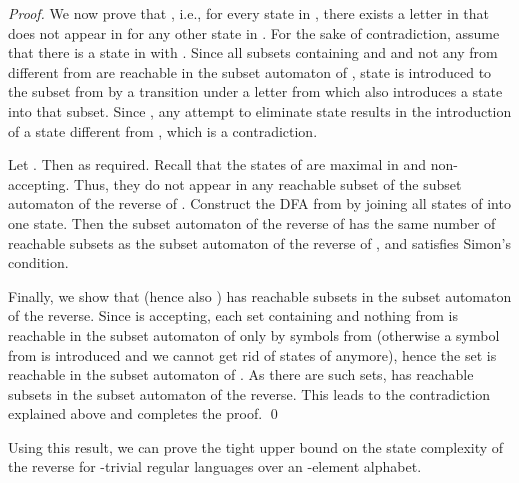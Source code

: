 \documentclass[runningheads]{llncs}
\newcommand{\J}{}
\begin{document}
\begin{proof}
    We now prove that , i.e., for every state  in ,
    there exists a letter  in 
    that does not appear in  for any other state  in .
    For the sake of contradiction,
    assume that there is a state  in  with .
Since all subsets containing  and  and not any  from 
    different from  are reachable in the subset automaton of ,
    state  is introduced to the subset from 
    by a transition under a letter from 
    which also introduces a state  into that subset.
    Since , 
    any attempt to eliminate state  results in the introduction of a state  different from , which is a contradiction.




    Let . Then  as required.
    Recall that the states of  are maximal in  and non-accepting.
    Thus, they do not appear in any reachable subset of the subset automaton of the reverse of .
Construct the DFA  from 
    by joining all states of  into one state.
    Then the subset automaton of the reverse of 
    has the same number of reachable subsets
    as the subset automaton of the reverse of ,
    and  satisfies Simon's condition.

    Finally, we show that  (hence also ) has  reachable subsets in the subset automaton of the reverse.
    Since  is accepting, each set  containing  and nothing from  is reachable in the subset automaton of  only by symbols from  (otherwise a symbol from  is introduced and we cannot get rid of states of  anymore),
    hence the set  is reachable in the subset automaton of .
As there are  such sets,  has  reachable subsets in the subset automaton of the reverse.
    This leads to the contradiction explained above and completes the proof.
  \qed\end{proof}
  
  Using this result, we can prove the tight upper bound 
  on the state complexity of the reverse 
  for \J-trivial regular languages over an -element alphabet.
\end{document}
